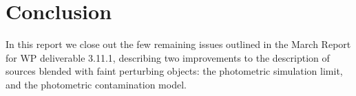 \documentclass[fleqn,usenatbib]{mnras}
\begin{document}
\section{Conclusion}
In this report we close out the few remaining issues outlined in the March Report for WP deliverable 3.11.1, describing two improvements to the description of sources blended with faint perturbing objects: the photometric simulation limit, and the photometric contamination model.







\bsp	%
\label{lastpage}
\end{document}
